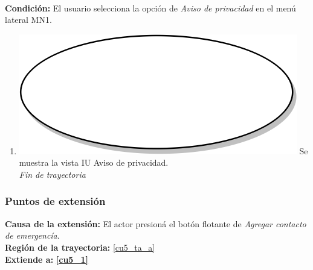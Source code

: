 \textbf{} \\
\textbf{Condición:} El usuario selecciona la opción de \textit{Aviso de privacidad} en el menú lateral MN1. \\
 \begin{enumerate}[label=H\arabic*]
    \item {\includegraphics[scale=.05]{Capitulo3/img/proceso.png} Se muestra la vista IU Aviso de privacidad.} \\
    \textit{Fin de trayectoria} \\
\end{enumerate}

\subsubsection{Puntos de extensión}
\noindent \textbf{Causa de la extensión:}  El actor presioná el botón flotante de \textit{Agregar contacto de emergencía}. \\
\textbf{Región de la trayectoria:} \ref{cu5_ta_a} \\
\textbf{Extiende a:} \textbf{\ref{cu5_1}}
